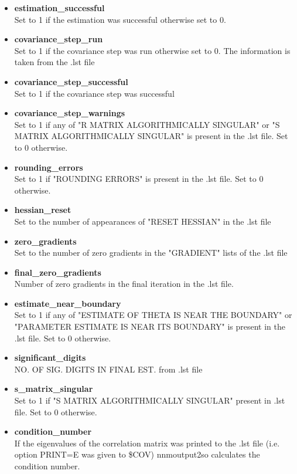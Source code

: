 \begin{itemize}
    \item \textbf{estimation\_successful} \\ Set to 1 if the estimation was successful otherwise set to 0.
    \item \textbf{covariance\_step\_run} \\ Set to 1 if the covariance step was run otherwise set to 0. The information is taken from the .lst file
    \item \textbf{covariance\_step\_successful} \\ Set to 1 if the covariance step was successful
    \item \textbf{covariance\_step\_warnings} \\ Set to 1 if any of "R MATRIX ALGORITHMICALLY SINGULAR" or "S MATRIX ALGORITHMICALLY SINGULAR" is present in the .lst file. Set to 0 otherwise.
    \item \textbf{rounding\_errors} \\ Set to 1 if "ROUNDING ERRORS" is present in the .lst file.  Set to 0 otherwise.
    \item \textbf{hessian\_reset} \\ Set to the number of appearances of "RESET HESSIAN" in the .lst file
    \item \textbf{zero\_gradients} \\ Set to the number of zero gradients in the "GRADIENT" lists of the .lst file
    \item \textbf{final\_zero\_gradients} \\ Number of zero gradients in the final iteration in the .lst file.
    \item \textbf{estimate\_near\_boundary} \\ Set to 1 if any of "ESTIMATE OF THETA IS NEAR THE BOUNDARY" or "PARAMETER ESTIMATE IS NEAR ITS BOUNDARY" is present in the .lst file. Set to 0 otherwise.
    \item \textbf{significant\_digits} \\ NO. OF SIG. DIGITS IN FINAL EST. from .lst file
    \item \textbf{s\_matrix\_singular} \\ Set to 1 if "S MATRIX ALGORITHMICALLY SINGULAR" present in .lst file. Set to 0 otherwise.
    \item \textbf{condition\_number} \\ If the eigenvalues of the correlation matrix was printed to the .lst file (i.e. option PRINT=E was given to \$COV) nnmoutput2so calculates the condition number. 
\end{itemize}


